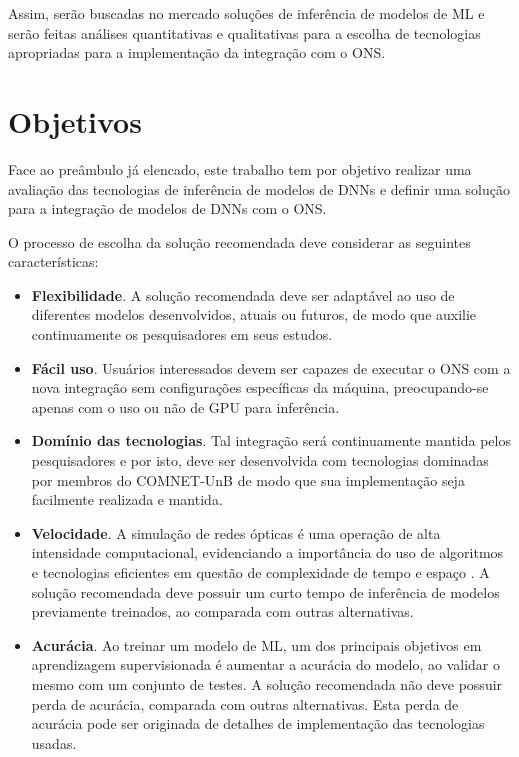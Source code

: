 Assim, serão buscadas no mercado soluções de inferência de modelos de ML e serão feitas análises quantitativas e qualitativas para a escolha de tecnologias apropriadas para a implementação da integração com o ONS.

\section{Objetivos}
\label{intro-goals}

Face ao preâmbulo já elencado, este trabalho tem por objetivo realizar uma avaliação das tecnologias de inferência de modelos de DNNs e definir uma solução para a integração de modelos de DNNs com o ONS.

O processo de escolha da solução recomendada deve considerar as seguintes características:

\begin{itemize}
  \item \textbf{Flexibilidade}. A solução recomendada deve ser adaptável ao uso de diferentes modelos desenvolvidos, atuais ou futuros, de modo que auxilie continuamente os pesquisadores em seus estudos.
  \item \textbf{Fácil uso}. Usuários interessados devem ser capazes de executar o ONS com a nova integração sem configurações específicas da máquina, preocupando-se apenas com o uso ou não de GPU para inferência.
  \item \textbf{Domínio das tecnologias}. Tal integração será continuamente mantida pelos pesquisadores e por isto, deve ser desenvolvida com tecnologias dominadas por membros do COMNET-UnB de modo que sua implementação seja facilmente realizada e mantida.
  \item \textbf{Velocidade}. A simulação de redes ópticas é uma operação de alta intensidade computacional, evidenciando a importância do uso de algoritmos e tecnologias eficientes em questão de complexidade de tempo e espaço \cite{chehab_2019}. A solução recomendada deve possuir um curto tempo de inferência de modelos previamente treinados, ao comparada com outras alternativas.
  \item \textbf{Acurácia}. Ao treinar um modelo de ML, um dos principais objetivos em aprendizagem supervisionada é aumentar a acurácia do modelo, ao validar o mesmo com um conjunto de testes. A solução recomendada não deve possuir perda de acurácia, comparada com outras alternativas. Esta perda de acurácia pode ser originada de detalhes de implementação das tecnologias usadas.
\end{itemize}


